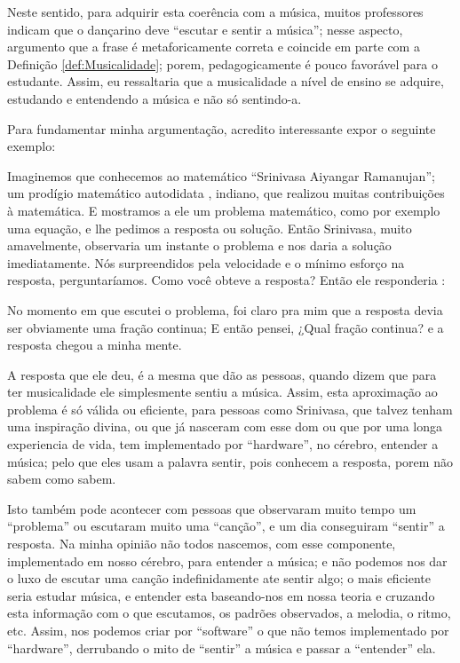 Neste sentido, para adquirir esta coerência com a música, 
muitos professores indicam que o dançarino deve ``escutar e sentir a música'';
nesse aspecto, argumento que a frase é metaforicamente correta e coincide em parte com a Definição \ref{def:Musicalidade};
porem, pedagogicamente  é pouco favorável para o estudante.
Assim, eu ressaltaria que a musicalidade a nível de ensino se adquire,
estudando e entendendo a música e não só sentindo-a.
 
Para fundamentar minha argumentação, acredito interessante expor o seguinte exemplo: 
\begin{example}
Imaginemos que conhecemos ao matemático ``Srinivasa Aiyangar Ramanujan'';
um prodígio matemático autodidata \cite[pp. 1]{kanigel2016man}, indiano, que 
realizou muitas contribuições à matemática.
E mostramos a ele um problema matemático, como por exemplo uma equação,
e  lhe pedimos a resposta ou solução. 
Então Srinivasa, muito amavelmente, 
observaria um instante o problema e nos daria a solução imediatamente.
Nós surpreendidos pela velocidade e o mínimo esforço na resposta,
perguntaríamos. Como você obteve a resposta? Então ele responderia \cite[pp. 235]{kanigel2016man}: 
\begin{citando}
No momento em que escutei o problema, 
foi claro pra mim que a resposta devia ser obviamente uma fração continua; 
E então pensei, ¿Qual fração continua? e a resposta chegou a minha mente. 
\end{citando}
\end{example}

A resposta que ele deu, 
é a mesma  que dão as pessoas, quando  dizem que para ter musicalidade ele simplesmente sentiu a música. 
Assim, esta aproximação ao problema é só válida ou eficiente, para pessoas como Srinivasa, 
que talvez tenham uma inspiração divina, 
ou que já nasceram com esse dom ou que por uma longa experiencia de vida, 
tem implementado por ``hardware'', no cérebro, entender a música; 
pelo que eles usam a palavra sentir, 
pois conhecem a resposta, porem não sabem como sabem. 

Isto também pode acontecer com pessoas que observaram muito tempo um ``problema'' ou escutaram muito uma ``canção'', 
e um dia conseguiram ``sentir'' a resposta. Na minha opinião não todos nascemos, 
com esse componente, implementado em nosso cérebro, para entender  a música; 
e não podemos nos dar o luxo de escutar uma canção indefinidamente ate sentir algo; 
o mais eficiente seria estudar música, 
e entender esta baseando-nos em nossa teoria e cruzando esta informação com o que escutamos, 
os padrões observados, a melodia, o ritmo, etc. 
Assim, nos podemos criar por ``software'' o que não temos implementado por ``hardware'', 
derrubando o mito de ``sentir'' a música e passar a ``entender'' ela.




